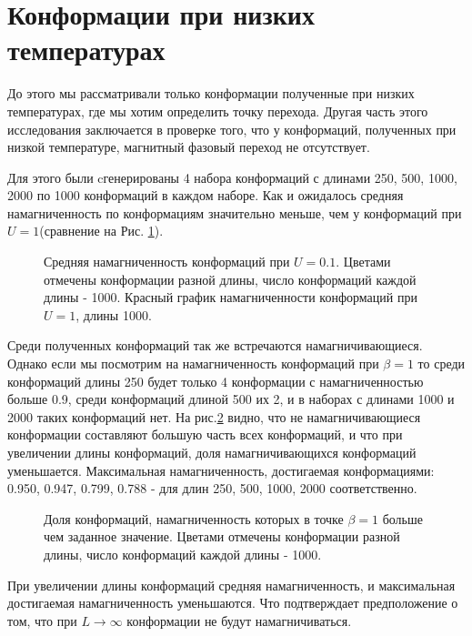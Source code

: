 \section{Конформации при низких температурах}
До этого мы рассматривали только конформации полученные при низких температурах, где мы хотим определить точку перехода. Другая часть этого исследования заключается в проверке того, что у конформаций, полученных при низкой температуре, магнитный фазовый переход не отсутствует.

Для этого были cгенерированы 4 набора конформаций с длинами 250, 500, 1000, 2000 по 1000 конформаций в каждом наборе. Как и ожидалось средняя намагниченность по конформациям значительно меньше, чем у конформаций при $U = 1$(сравнение на Рис. \ref{fig:U0.1_mean_mag2}).

\begin{figure}[htb]
	\centering
	

	\caption{Средняя намагниченность конформаций при $U=0.1$. Цветами отмечены конформации разной длины, число конформаций каждой длины - 1000. Красный график намагниченности конформаций при $U=1$, длины 1000.}
	\label{fig:U0.1_mean_mag2}
\end{figure}

Среди полученных конформаций так же встречаются намагничивающиеся. Однако если мы посмотрим на намагниченность конформаций при $\beta = 1$ то среди конформаций длины 250 будет только 4 конформации с намагниченностью больше 0.9, среди конформаций длиной 500 их 2, и в наборах с длинами 1000 и 2000 таких конформаций нет. На рис.\ref{fig:fraction_magnetization} видно, что не намагничивающиеся конформации составляют большую часть всех конформаций, и что при увеличении длины конформаций, доля намагничивающихся конформаций уменьшается. Максимальная намагниченность, достигаемая конформациями: 0.950, 0.947, 0.799, 0.788 - для длин 250, 500, 1000, 2000 соответственно.

\begin{figure}[htb]
	\centering
	
	\caption{Доля конформаций, намагниченность которых в точке $\beta = 1$ больше чем заданное значение. Цветами отмечены конформации разной длины, число конформаций каждой длины - 1000.}
	\label{fig:fraction_magnetization}
\end{figure}

При увеличении длины конформаций средняя намагниченность, и максимальная достигаемая намагниченность уменьшаются. Что подтверждает предположение о том, что при $L\to \infty$ конформации не будут намагничиваться.



